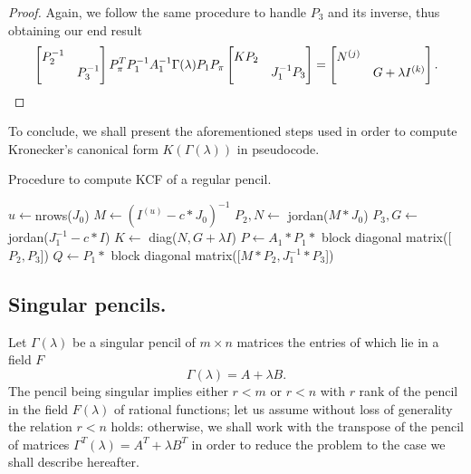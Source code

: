 \begin{proof}
    Again, we follow the same procedure to handle \(P_{3}\) and its inverse, thus obtaining our end result
    \begin{gather}
        \scalemath{0.975}{
            \begin{bmatrix}
                P_{2}^{-1} & \\
                & P_{3}^{-1}
            \end{bmatrix}
            P_{\pi}^T P_{1}^{-1} A_{1}^{-1} \Gamma(\lambda) P_{1} P_{\pi}
            \begin{bmatrix}
                KP_{2} & \\
                & J_{1}^{-1}P_{3}
            \end{bmatrix} =
            \begin{bmatrix}
                N^{(j)} & \\
                & G + \lambda I^{(k)}
            \end{bmatrix}. \label{gamma-reg}
        }
    \end{gather}
\end{proof}


To conclude, we shall present the aforementioned steps used in order to compute Kronecker's canonical form
\(K(\Gamma(\lambda))\) in pseudocode.
\pagebreak
\begin{algorithm}[!h]\label{alg:kcf-regular}
    \caption{Procedure to compute KCF of a regular pencil.}
    $u \gets $nrows($J_0$)\;
    $M \gets (I^{(u)} - c*J_{0})^{-1}$\;
    $P_2, N \gets $ jordan($M * J_0$)\;
    $P_3, G \gets $ jordan($J_{1}^{-1} - c*I$)\;
    $K \gets $ diag($N, G +\lambda I$)\;
    $P \gets A_1 * P_1 * $ block diagonal matrix([$P_2, P_3$])\;
    $Q \gets P_1 * $ block diagonal matrix([$M * P_2, J_1^{-1} * P_3$])\;
    \;
\end{algorithm}
\pagebreak
\subsection*{Singular pencils.}

Let \(\Gamma(\lambda)\) be a singular pencil of \(m \times n\) matrices the entries of which lie in a field \(F\)
\[\Gamma(\lambda) = A + \lambda B.\]
The pencil being singular implies either \(r < m\) or \(r < n\) with \(r\) rank of the pencil in the field \(F(\lambda)\)
of rational functions; let us assume without loss of generality the
relation \(r < n\) holds: otherwise, we shall work with the transpose of the pencil of matrices
\(\Gamma^{T}(\lambda) = A^T + \lambda B^T\) in order to reduce the problem to the case we shall describe hereafter.

